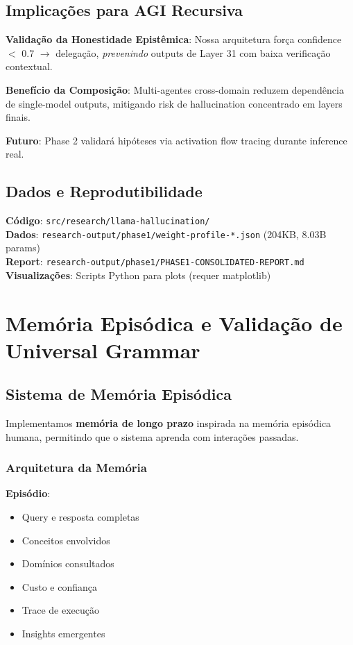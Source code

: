 \documentclass[11pt]{article}
\begin{document}
\subsection{Implicações para AGI Recursiva}

\textbf{Validação da Honestidade Epistêmica}: Nossa arquitetura força confidence $<$ 0.7 $\rightarrow$ delegação, \textit{prevenindo} outputs de Layer 31 com baixa verificação contextual.

\textbf{Benefício da Composição}: Multi-agentes cross-domain reduzem dependência de single-model outputs, mitigando risk de hallucination concentrado em layers finais.

\textbf{Futuro}: Phase 2 validará hipóteses via activation flow tracing durante inference real.

\subsection{Dados e Reprodutibilidade}

\textbf{Código}: \texttt{src/research/llama-hallucination/}\\
\textbf{Dados}: \texttt{research-output/phase1/weight-profile-*.json} (204KB, 8.03B params)\\
\textbf{Report}: \texttt{research-output/phase1/PHASE1-CONSOLIDATED-REPORT.md}\\
\textbf{Visualizações}: Scripts Python para plots (requer matplotlib)

\section{Memória Episódica e Validação de Universal Grammar}

\subsection{Sistema de Memória Episódica}

Implementamos \textbf{memória de longo prazo} inspirada na memória episódica humana, permitindo que o sistema aprenda com interações passadas.

\subsubsection{Arquitetura da Memória}

\textbf{Episódio}:
\begin{itemize}
    \item Query e resposta completas
    \item Conceitos envolvidos
    \item Domínios consultados
    \item Custo e confiança
    \item Trace de execução
    \item Insights emergentes
\end{itemize}
\end{document}
